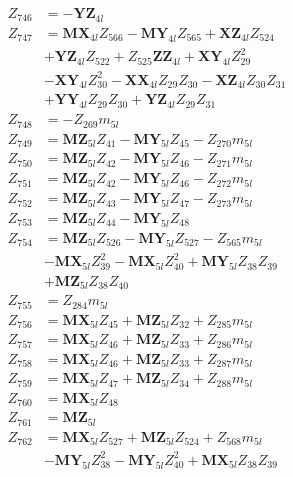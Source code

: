 \begin{multicols}{2}
\begin{align}
Z_{746} &= -\mathbf{YZ}_{4l} \nonumber \\
Z_{747} &= \mathbf{MX}_{4l}Z_{566} - \mathbf{MY}_{4l}Z_{565} + \mathbf{XZ}_{4l}Z_{524}  \nonumber \\
&+ \mathbf{YZ}_{4l}Z_{522} + Z_{525}\mathbf{ZZ}_{4l} + \mathbf{XY}_{4l}Z_{29}^2  \nonumber \\
&- \mathbf{XY}_{4l}Z_{30}^2 - \mathbf{XX}_{4l}Z_{29}Z_{30} - \mathbf{XZ}_{4l}Z_{30}Z_{31}  \nonumber \\
&+ \mathbf{YY}_{4l}Z_{29}Z_{30} + \mathbf{YZ}_{4l}Z_{29}Z_{31} \nonumber \\
Z_{748} &= -Z_{269}m_{5l} \nonumber \\
Z_{749} &= \mathbf{MZ}_{5l}Z_{41} - \mathbf{MY}_{5l}Z_{45} - Z_{270}m_{5l} \nonumber \\
Z_{750} &= \mathbf{MZ}_{5l}Z_{42} - \mathbf{MY}_{5l}Z_{46} - Z_{271}m_{5l} \nonumber \\
Z_{751} &= \mathbf{MZ}_{5l}Z_{42} - \mathbf{MY}_{5l}Z_{46} - Z_{272}m_{5l} \nonumber \\
Z_{752} &= \mathbf{MZ}_{5l}Z_{43} - \mathbf{MY}_{5l}Z_{47} - Z_{273}m_{5l} \nonumber \\
Z_{753} &= \mathbf{MZ}_{5l}Z_{44} - \mathbf{MY}_{5l}Z_{48} \nonumber \\
Z_{754} &= \mathbf{MZ}_{5l}Z_{526} - \mathbf{MY}_{5l}Z_{527} - Z_{565}m_{5l}  \nonumber \\
&- \mathbf{MX}_{5l}Z_{39}^2 - \mathbf{MX}_{5l}Z_{40}^2 + \mathbf{MY}_{5l}Z_{38}Z_{39}  \nonumber \\
&+ \mathbf{MZ}_{5l}Z_{38}Z_{40} \nonumber \\
Z_{755} &= Z_{284}m_{5l} \nonumber \\
Z_{756} &= \mathbf{MX}_{5l}Z_{45} + \mathbf{MZ}_{5l}Z_{32} + Z_{285}m_{5l} \nonumber \\
Z_{757} &= \mathbf{MX}_{5l}Z_{46} + \mathbf{MZ}_{5l}Z_{33} + Z_{286}m_{5l} \nonumber \\
Z_{758} &= \mathbf{MX}_{5l}Z_{46} + \mathbf{MZ}_{5l}Z_{33} + Z_{287}m_{5l} \nonumber \\
Z_{759} &= \mathbf{MX}_{5l}Z_{47} + \mathbf{MZ}_{5l}Z_{34} + Z_{288}m_{5l} \nonumber \\
Z_{760} &= \mathbf{MX}_{5l}Z_{48} \nonumber \\
Z_{761} &= \mathbf{MZ}_{5l} \nonumber \\
Z_{762} &= \mathbf{MX}_{5l}Z_{527} + \mathbf{MZ}_{5l}Z_{524} + Z_{568}m_{5l}  \nonumber \\
&- \mathbf{MY}_{5l}Z_{38}^2 - \mathbf{MY}_{5l}Z_{40}^2 + \mathbf{MX}_{5l}Z_{38}Z_{39}  \nonumber \\

\end{align}
\end{multicols}
